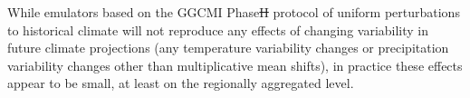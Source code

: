 \documentclass[gmdd]{copernicus} %
\providecommand{\DIFadd}[1]{{\protect\color{blue}\uwave{#1}}} %
\providecommand{\DIFdel}[1]{{\protect\color{red}\sout{#1}}}                      %
\providecommand{\DIFaddbegin}{} %
\providecommand{\DIFaddend}{} %
\providecommand{\DIFdelbegin}{} %
\providecommand{\DIFdelend}{} %
\begin{document}
While emulators based on the GGCMI Phase\DIFdelbegin \DIFdel{II }\DIFdelend \DIFaddbegin \DIFadd{~2 }\DIFaddend protocol of uniform perturbations to historical climate will not reproduce any effects of changing variability in future climate projections (any temperature variability changes or precipitation variability changes other than multiplicative mean shifts), in practice these effects appear to be small, at least on the regionally aggregated level. 


\DIFdelbegin %
\end{document}
